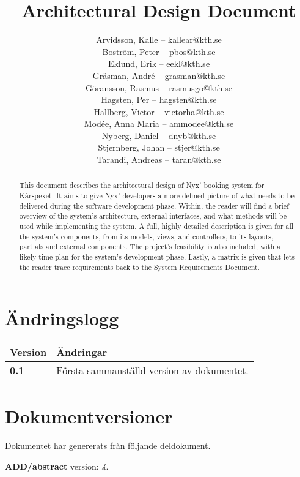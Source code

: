 \documentclass[a4paper, twoside, 11pt, titlepage]{article}
\author{
	\small
	Arvidsson, Kalle -- kallear@kth.se\\
	Boström, Peter -- pbos@kth.se\\
	Eklund, Erik -- eekl@kth.se\\
	Gräsman, André -- grasman@kth.se\\
	Göransson, Rasmus -- rasmusgo@kth.se\\
	Hagsten, Per -- hagsten@kth.se\\
	Hallberg, Victor -- victorha@kth.se\\
	Modée, Anna Maria -- ammodee@kth.se\\
	Nyberg, Daniel -- dnyb@kth.se\\
	Stjernberg, Johan -- stjer@kth.se\\
	Tarandi, Andreas -- taran@kth.se
	}
\title{Architectural Design Document}
\begin{document}
\maketitle

\clearpage
\thispagestyle{empty}
\mbox{}
\newpage

\begin{abstract}
	This document describes the architectural design of Nyx' booking system for Kårspexet. It aims to give Nyx' developers  a more defined picture of what needs to be delivered during the software development phase. 
Within, the reader will find a brief overview of the system's architecture, external interfaces, and what methods will be used while implementing the system. A full, highly detailed description is given for all the system's components, from its models, views, and controllers, to its layouts, partials and external components. The project's feasibility is also included, with a likely time plan for the system's development phase. Lastly, a matrix is given that lets the reader trace requirements back to the System Requirements Document.
\end{abstract}

\newpage

\setcounter{page}{1}

\startfooter

\clearpage
\section*{Ändringslogg}


\begin {table} [ht] \begin{tabular} { p{2.6cm} p{12.5cm} }
	\hline
	\sffamily\textbf{Version} & \sffamily\textbf{Ändringar } \\
	\hline
	\sffamily\textbf{0.1} & Första sammanställd version av dokumentet.  \\
	\hline
\end{tabular} \end{table} \FloatBarrier


\clearpage
\section*{Dokumentversioner}


Dokumentet har genererats från följande deldokument.

\textbf{ADD/abstract} version: \emph{4}.
\end{document}
